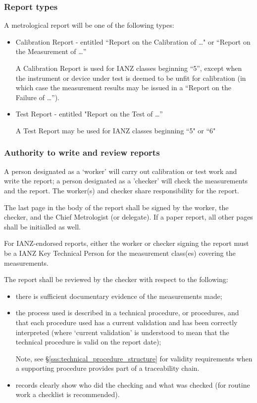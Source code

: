 \subsubsection{Report types}
A metrological report will be one of the following types:
\begin{itemize}
\item Calibration Report - entitled ``Report on the Calibration of \ldots" or ``Report on the Measurement of \ldots'' 

A Calibration Report is used for IANZ classes beginning ``5'', except when the instrument or device under test is deemed to be unfit for calibration (in which case the measurement results may be issued in a ``Report on the Failure of \ldots'').

\item Test Report - entitled "Report on the Test of \ldots''  

A Test Report may be used for IANZ classes beginning ``5" or ``6"
\end{itemize} 

\subsubsection{Authority to write and review reports}
A person designated as a `worker' will carry out calibration or test work and write the report; a person designated as a 'checker' will check the measurements and the report. The worker(s) and checker share responsibility for the report.

The last page in the body of the report shall be signed by the worker, the checker, and the Chief Metrologist (or delegate). If a paper report, all other pages shall be initialled as well.

For IANZ-endorsed reports, either the worker or checker signing the report must be a IANZ Key Technical Person for the measurement class(es) covering the measurements.

The report shall be reviewed by the checker with respect to the following: 
\begin{itemize}
\item there is sufficient documentary evidence of the measurements made;
\item the process used is described in a technical procedure, or procedures, and that each procedure used has a current validation and has been correctly interpreted (where `current validation' is understood to mean that the technical procedure is valid on the report date);

Note, see \S\ref{sss:technical_procedure_structure} for validity requirements when a supporting procedure provides part of a traceability chain.

\item records clearly show who did the checking and what was checked (for routine work a checklist is recommended).
\end{itemize} 

